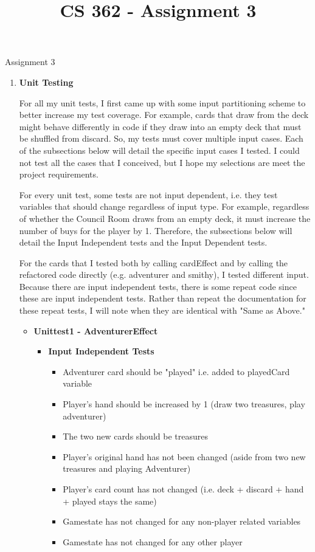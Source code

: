 \documentclass[11pt,letterpaper]{article}
\begin{document}
 \univlogo

\title{CS 362 - Assignment 3}
{\Huge Assignment 3}\\[5mm]
\begin{enumerate}[label=\Roman*.]
  \item \textbf{Unit Testing}
    
    For all my unit tests, I first came up with some input partitioning scheme
    to better increase my test coverage. For example, cards that draw from the
    deck might behave differently in code if they draw into an empty deck that
    must be shuffled from discard. So, my tests must cover multiple input cases. 
    Each of the subsections below will detail the specific input cases I tested. 
    I could not test all the cases that I conceived, 
    but I hope my selections are meet the project requirements. 

    For every unit test, some tests are not 
    input dependent, i.e. they test variables that should change regardless of
    input type. For example, regardless of whether the Council Room draws from
    an empty deck, it must increase the number of buys for the player by 1. 
    Therefore, the subsections below will detail the Input Independent tests
    and the Input Dependent tests. 

    For the cards that I tested both by calling cardEffect and by calling
    the refactored code directly (e.g. adventurer and smithy), I tested
    different input. Because there are input independent tests, there is
    some repeat code since these are input independent tests. Rather than
    repeat the documentation for these repeat tests, I will note when they
    are identical with "Same as Above."

    \begin{itemize}[leftmargin=*]
      \item \textbf{Unittest1 - AdventurerEffect}
        
        \begin{itemize}[leftmargin=*, label={}]
          \item \textbf{Input Independent Tests}

            \begin{itemize}[leftmargin=*]
              \item Adventurer card should be "played" i.e. added to playedCard variable
              \item Player's hand should be increased by 1 (draw two treasures, play adventurer)
              \item The two new cards should be treasures
              \item Player's original hand has not been changed (aside from two new treasures and playing Adventurer)
              \item Player's card count has not changed (i.e. deck + discard + hand + played stays the same)
              \item Gamestate has not changed for any non-player related variables
              \item Gamestate has not changed for any other player
            \end{itemize}


\end{itemize}
\end{itemize}
\end{enumerate}
\end{document}
